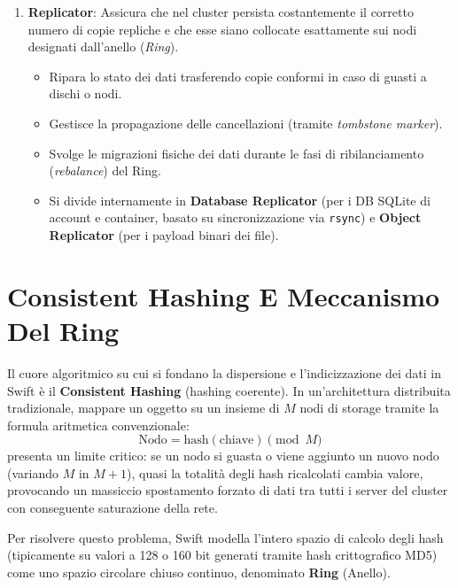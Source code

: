\documentclass[11pt, a4paper]{article}
\begin{document}
\begin{enumerate}
\begin{itemize}[noitemsep]
    \end{itemize}
    \item \textbf{Replicator}:
    Assicura che nel cluster persista costantemente il corretto numero di copie repliche e che esse siano collocate esattamente sui nodi designati dall'anello (\emph{Ring}).
    \begin{itemize}[noitemsep]
        \item Ripara lo stato dei dati trasferendo copie conformi in caso di guasti a dischi o nodi.
        \item Gestisce la propagazione delle cancellazioni (tramite \emph{tombstone marker}).
        \item Svolge le migrazioni fisiche dei dati durante le fasi di ribilanciamento (\emph{rebalance}) del Ring.
        \item Si divide internamente in \textbf{Database Replicator} (per i DB SQLite di account e container, basato su sincronizzazione via \texttt{rsync}) e \textbf{Object Replicator} (per i payload binari dei file).
    \end{itemize}
\end{enumerate}

\newpage

\section{Consistent Hashing E Meccanismo Del Ring}

Il cuore algoritmico su cui si fondano la dispersione e l'indicizzazione dei dati in Swift è il \textbf{Consistent Hashing} (hashing coerente). In un'architettura distribuita tradizionale, mappare un oggetto su un insieme di $M$ nodi di storage tramite la formula aritmetica convenzionale:
\[
    \text{Nodo} = \text{hash}(\text{chiave}) \pmod M
\]
presenta un limite critico: se un nodo si guasta o viene aggiunto un nuovo nodo (variando $M$ in $M+1$), quasi la totalità degli hash ricalcolati cambia valore, provocando un massiccio spostamento forzato di dati tra tutti i server del cluster con conseguente saturazione della rete.

Per risolvere questo problema, Swift modella l'intero spazio di calcolo degli hash (tipicamente su valori a 128 o 160 bit generati tramite hash crittografico MD5) come uno spazio circolare chiuso continuo, denominato \textbf{Ring} (Anello).

\end{document}
